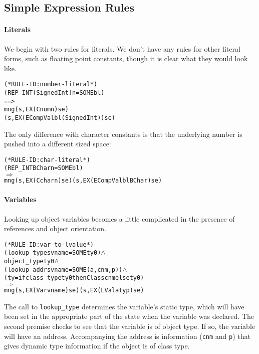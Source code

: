 \documentclass[11pt]{article}
\begin{document}
\subsection{Simple Expression Rules}
\label{sec:simple-expr-rules}

\paragraph{Literals} We begin with two rules for literals.  We don't
have any rules for other literal forms, such as floating point
constants, though it is clear what they would look like.
%
%
\begin{alltt}
(* RULE-ID: number-literal *)
     (REP_INT (Signed Int) n = SOME bl)
   ==>
     mng (s, EX (Cnum n) se)
         (s, EX (ECompVal bl (Signed Int)) se)
\end{alltt}

The only difference with character constants is that the underlying
number is pushed into a different sized space:
%
\begin{alltt}
(* RULE-ID: char-literal *)
     (REP_INT BChar n = SOME bl)
   \(\Rightarrow\)
     mng (s, EX (Cchar n) se) (s, EX (ECompVal bl BChar) se)
\end{alltt}

\paragraph{Variables} Looking up object variables becomes a little
complicated in the presence of references and object orientation.
%
%
\begin{alltt}
(* RULE-ID: var-to-lvalue *)
     (lookup_type s vname = SOME ty0) \(\land\)
     object_type ty0 \(\land\)
     (lookup_addr s vname = SOME (a,cnm,p)) \(\land\)
     (ty = if class_type ty0 then Class cnm else ty0)
   \(\Rightarrow\)
     mng (s, EX (Var vname) se) (s, EX (LVal a ty p) se)
\end{alltt}
%
The call to \texttt{lookup_type} determines the variable's static
type, which will have been set in the appropriate part of the state
when the variable was declared.  The second premise checks to see that
the variable is of object type.  If so, the variable will have an
address.  Accompanying the address is information (\texttt{cnm} and
\texttt{p}) that gives dynamic type information if the object is of
class type.
\end{document}
